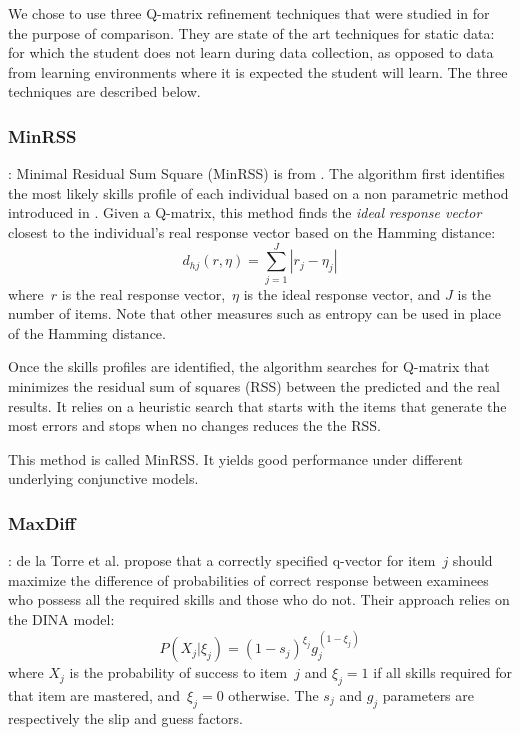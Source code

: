 \documentclass[runningheads,a4paper]{llncs}
\begin{document}
We chose to use three Q-matrix refinement techniques that were studied in \cite{desmarais2014refinement,desmarais2015combining} for the purpose of comparison.  They are state of the art techniques for static data: for which the student does not learn during data collection, as opposed to data from learning environments where it is expected the student will learn. The three techniques are described below.

\subsubsection{MinRSS} :
Minimal Residual Sum Square (MinRSS) is from \cite{chiu2013statistical}.  The algorithm first identifies the most likely skills profile of each individual based on a non parametric method introduced in \cite{chiu2013nonparametric}.  Given a Q-matrix, this method finds the \textit{ideal response vector} closest to the individual's real response vector based on the Hamming distance:
\begin{equation}  
d_{hj}(r,\eta)=\sum_{j=1}^{J}|r_j-\eta_j| 
\end{equation}
  where~$r$ is the real response vector,~$\eta$ is the ideal response vector, and $J$ is the number of items. Note that other measures such as entropy can be used in place of the Hamming distance.

Once the skills profiles are identified, the algorithm searches for Q-matrix that minimizes the residual sum of squares (RSS) between the predicted and the real results.  It relies on a heuristic search that starts with the items that generate the most errors and stops when no changes reduces the the RSS.

This method is called MinRSS.  It yields good performance under different underlying conjunctive models. 

\subsubsection{MaxDiff} :
de la Torre et al. \cite{de2008empirically,de2009dina} propose that a correctly specified q-vector for item~$j$ should maximize the difference of probabilities of correct response between examinees who possess all the required skills and those who do not. Their approach relies on the DINA model:
\[ P(X_j | \xi_j) = (1 - s_j)^{\xi_j} g_j^{(1- \xi_j)} \]
where $X_j$ is the probability of success to item~$j$ and $\xi_j=1$ if all skills required for that item are mastered, and~$\xi_j=0$ otherwise. The $s_j$ and $g_j$ parameters are respectively the slip and guess factors.
\end{document}
